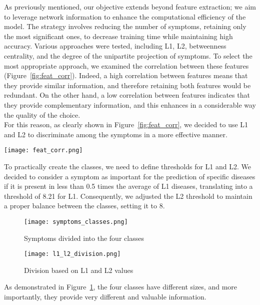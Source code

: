 As previously mentioned, our objective extends beyond feature extraction; we aim to leverage network information to
enhance the computational efficiency of the model. The strategy involves reducing the number of symptoms,
retaining only the most significant ones, to decrease training time while maintaining high accuracy.
Various approaches were tested, including L1, L2, betweenness centrality, and the degree of the unipartite projection
of symptoms. To select the most appropriate approach, we examined the correlation between these features
(Figure~\ref{fig:feat_corr}). Indeed, a high correlation between features means that they provide
similar information, and therefore retaining both features would be redundant. On the other hand,
a low correlation between features indicates that they provide complementary information, and this enhances
in a considerable way the quality of the choice.\\
For this reason, as clearly shown in Figure~\ref{fig:feat_corr}, we decided to use L1 and L2 to discriminate
among the symptoms in a more effective manner.

\begin{figure*}[!t]
    \centering
    \texttt{[image: feat\_corr.png]}
    \caption{Correlation between features}\label{fig:feat_corr}
\end{figure*}

\noindent
To practically create the classes, we need to define thresholds for L1 and L2. We decided to consider
a symptom as important for the prediction of specific diseases if it is present in less than 0.5 times the average of L1 diseases,
translating into a threshold of 8.21 for L1. Consequently, we adjusted the L2 threshold to maintain a proper balance
between the classes, setting it to 8.

\begin{figure}[H]
    \centering
    \texttt{[image: symptoms\_classes.png]}
    \caption{Symptoms divided into the four classes}\label{fig:symptoms_classes}
\end{figure}

\begin{figure}[H]
    \centering
    \texttt{[image: l1\_l2\_division.png]}
    \caption{Division based on L1 and L2 values}\label{fig:l1_l2_division}
\end{figure}

\noindent
As demonstrated in Figure~\ref{fig:symptoms_classes}, the four classes have different sizes, and more importantly,
they provide very different and valuable information.

